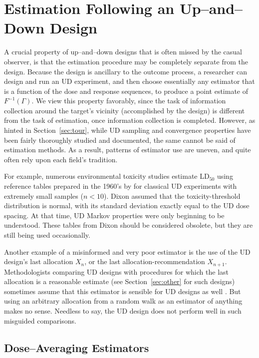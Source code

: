 \section{Estimation Following an Up--and--Down Design}\label{sec:est}

A crucial property of up--and--down designs that is often missed by the casual observer, is that the estimation procedure may be completely separate from the design. Because the design is ancillary \citep{Rose:Flou:Durh:asym:1997} to the outcome process, a researcher can design and run an UD experiment, and then choose essentially any estimator that is a function of the dose and response sequences, to produce a point  estimate of $F^{-1}(\Gamma)$.  We view this property favorably, since the task of information collection around the target's vicinity (accomplished by the design) is different from the task of estimation, once information collection is completed. However, as hinted in Section~\ref{sec:tour}, while UD sampling and convergence properties have been fairly thoroughly studied and documented, the same cannot be said of estimation methods.   As a result, patterns of estimator use are uneven, and quite often rely upon each field's tradition.

For example, numerous environmental toxicity studies \citep{Lich:updo:1998,Sund:Patr:Jull:Warn:Use:2004,Sween:etal:canines:2010} estimate LD$_{50}$ using reference tables prepared in the 1960's by \cite{Dixo:up-a:1965} for classical UD experiments with extremely small samples ($n<10$). Dixon assumed that the toxicity-threshold distribution is normal, with its standard deviation exactly equal to the UD dose spacing. At that time, UD Markov properties were only beginning to be understood. These tables from Dixon should be considered obsolete, but they are still being used occasionally.

Another example of a misinformed and very poor estimator is the use of the UD design's last allocation $X_n$, or the last allocation-recommendation $X_{n+1}$.  Methodologists comparing UD designs with procedures for which the last allocation is a reasonable estimate (see Section~\ref{sec:other} for such designs) sometimes assume that this estimator is sensible for UD designs as well \citep{O'Qu:Chev:meth:1991,Zack:stag:2009}. But using an arbitrary allocation from a random walk as an estimator of anything makes no sense. Needless to say, the UD design does not perform well in such misguided comparisons.

\subsection{Dose--Averaging Estimators}\label{sec:averaging}


